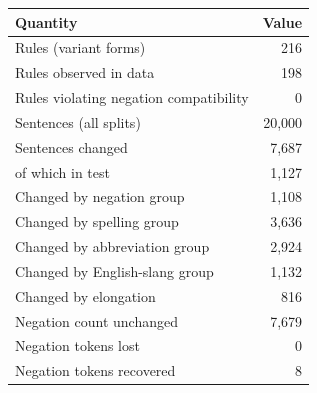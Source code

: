 \begin{tabular}{lr}
\toprule
Quantity & Value\\
\midrule
Rules (variant forms) & 216\\
Rules observed in data & 198\\
Rules violating negation compatibility & 0\\
Sentences (all splits) & 20,000\\
Sentences changed & 7,687\\
\quad of which in test & 1,127\\
Changed by negation group & 1,108\\
Changed by spelling group & 3,636\\
Changed by abbreviation group & 2,924\\
Changed by English-slang group & 1,132\\
Changed by elongation & 816\\
Negation count unchanged & 7,679\\
Negation tokens lost & 0\\
Negation tokens recovered & 8\\
\bottomrule
\end{tabular}
